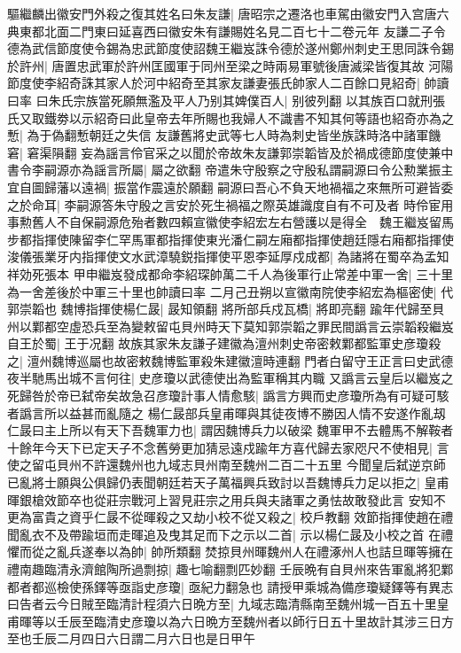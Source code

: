 驅繼麟出徽安門外殺之復其姓名曰朱友謙|{
	唐昭宗之遷洛也車駕由徽安門入宫唐六典東都北面二門東曰延喜西曰徽安朱有謙賜姓名見二百七十二卷元年}
友謙二子令德為武信節度使令錫為忠武節度使詔魏王繼岌誅令德於遂州鄭州刺史王思同誅令錫於許州|{
	唐置忠武軍於許州匡國軍于同州至梁之時兩易軍號後唐滅梁皆復其故}
河陽節度使李紹奇誅其家人於河中紹奇至其家友謙妻張氏帥家人二百餘口見紹奇|{
	帥讀曰率}
曰朱氏宗族當死願無濫及平人乃别其婢僕百人|{
	别彼列翻}
以其族百口就刑張氏又取鐵劵以示紹奇曰此皇帝去年所賜也我婦人不識書不知其何等語也紹奇亦為之慙|{
	為于偽翻慙朝廷之失信}
友謙舊將史武等七人時為刺史皆坐族誅時洛中諸軍饑窘|{
	窘渠隕翻}
妄為謡言伶官采之以聞於帝故朱友謙郭崇韜皆及於禍成德節度使兼中書令李嗣源亦為謡言所屬|{
	屬之欲翻}
帝遣朱守殷察之守殷私謂嗣源曰令公勲業振主宜自圖歸藩以遠禍|{
	振當作震遠於願翻}
嗣源曰吾心不負天地禍福之來無所可避皆委之於命耳|{
	李嗣源答朱守殷之言安於死生禍福之際英雄識度自有不可及者}
時伶宦用事勲舊人不自保嗣源危殆者數四賴宣徽使李紹宏左右營護以是得全　魏王繼岌留馬步都指揮使陳留李仁罕馬軍都指揮使東光潘仁嗣左廂都指揮使趙廷隱右廂都指揮使浚儀張業牙内指揮使文水武漳驍鋭指揮使平恩李延厚戍成都|{
	為諸將在蜀卒為孟知祥効死張本}
甲申繼岌發成都命李紹琛帥萬二千人為後軍行止常差中軍一舍|{
	三十里為一舍差後於中軍三十里也帥讀曰率}
二月己丑朔以宣徽南院使李紹宏為樞密使|{
	代郭崇韜也}
魏博指揮使楊仁晸|{
	晸知領翻}
將所部兵戍瓦橋|{
	將即亮翻}
踰年代歸至貝州以鄴都空虛恐兵至為變敕留屯貝州時天下莫知郭崇韜之罪民間譌言云崇韜殺繼岌自王於蜀|{
	王于况翻}
故族其家朱友謙子建徽為澶州刺史帝密敕鄴都監軍史彦瓊殺之|{
	澶州魏博巡屬也故密敕魏博監軍殺朱建徽澶時連翻}
門者白留守王正言曰史武德夜半馳馬出城不言何往|{
	史彦瓊以武德使出為監軍稱其内職}
又譌言云皇后以繼岌之死歸咎於帝已弑帝矣故急召彦瓊計事人情愈駭|{
	譌言方興而史彦瓊所為有可疑可駭者譌言所以益甚而亂隨之}
楊仁晸部兵皇甫暉與其徒夜博不勝因人情不安遂作亂刼仁晸曰主上所以有天下吾魏軍力也|{
	謂因魏博兵力以破梁}
魏軍甲不去體馬不解鞍者十餘年今天下已定天子不念舊勞更加猜忌遠戍踰年方喜代歸去家咫尺不使相見|{
	言使之留屯貝州不許還魏州也九域志貝州南至魏州二百二十五里}
今聞皇后弑逆京師已亂將士願與公俱歸仍表聞朝廷若天子萬福興兵致討以吾魏博兵力足以拒之|{
	皇甫暉銀槍效節卒也從莊宗戰河上習見莊宗之用兵與夫諸軍之勇怯故敢發此言}
安知不更為富貴之資乎仁晸不從暉殺之又劫小校不從又殺之|{
	校戶教翻}
效節指揮使趙在禮聞亂衣不及帶踰垣而走暉追及曳其足而下之示以二首|{
	示以楊仁晸及小校之首}
在禮懼而從之亂兵遂奉以為帥|{
	帥所類翻}
焚掠貝州暉魏州人在禮涿州人也詰旦暉等擁在禮南趣臨清永濟館陶所過剽掠|{
	趣七喻翻剽匹妙翻}
壬辰晩有自貝州來告軍亂將犯鄴都者都巡檢使孫鐸等亟詣史彦瓊|{
	亟紀力翻急也}
請授甲乘城為備彦瓊疑鐸等有異志曰告者云今日賊至臨清計程須六日晩方至|{
	九域志臨清縣南至魏州城一百五十里皇甫暉等以壬辰至臨清史彦瓊以為六日晩方至魏州者以師行日五十里故計其涉三日方至也壬辰二月四日六日謂二月六日也是日甲午}
